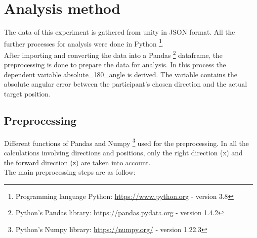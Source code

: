 

\section{Analysis method}

The data of this experiment is gathered from unity in JSON format. All the further processes for analysis were done in Python  \footnote{Programming language Python: \href{https://www.python.org}{https://www.python.org} - version 3.8}. \\
After importing and converting the data into a Pandas \footnote{Python's Pandas library: \href{https://pandas.pydata.org}{https://pandas.pydata.org} - version 1.4.2} dataframe, the preprocessing is done to prepare the data for analysis. In this process the dependent variable {\emphasize absolute\_180\_angle} is derived. The variable contains the absolute angular error between the participant's chosen direction and the actual target position. 

\subsection{Preprocessing}

Different functions of Pandas and Numpy \footnote{Python's Numpy library: \href{https://numpy.org/}{https://numpy.org/} - version 1.22.3} used for the preprocessing. In all the calculations involving directions and positions, only the right direction (x) and the forward direction (z) are taken into account. \\
The main preprocessing steps are as follow:

